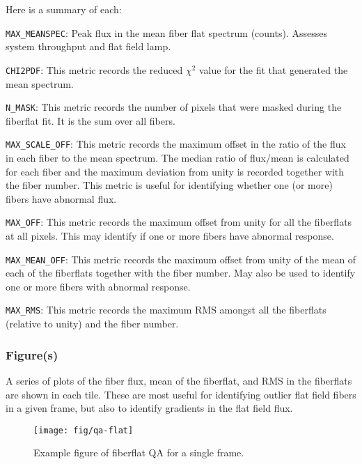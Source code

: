 \documentclass[12pt]{article}
\begin{document}
\noindent
Here is a summary of each:

\vskip 0.2in

\noindent
{\tt MAX\_MEANSPEC}:  Peak flux in the mean fiber flat spectrum 
(counts).  Assesses system throughput and flat field lamp.

\noindent
{\tt CHI2PDF}:  This metric records the reduced $\chi^2$ value 
for the fit that generated the mean spectrum.

\noindent
{\tt N\_MASK}:  This metric records the number of pixels that were
masked during the fiberflat fit.  It is the sum over all fibers.

\noindent
{\tt MAX\_SCALE\_OFF}:  This metric records the maximum offset 
in the ratio of the flux in each fiber to the mean spectrum.
The median ratio of flux/mean
is calculated for each fiber and the maximum
deviation from unity is recorded together with the fiber number.  
This metric is useful for
identifying whether one (or more) fibers have abnormal flux.

\noindent
{\tt MAX\_OFF}:  This metric records the maximum offset from
unity for all the fiberflats at all pixels.
This may identify if one or more fibers have abnormal response.

\noindent
{\tt MAX\_MEAN\_OFF}:  This metric records the maximum offset from
unity of the mean of each of the fiberflats together with the
fiber number.  May also be used
to identify one or more fibers with abnormal response.

\noindent
{\tt MAX\_RMS}:  This metric records the maximum RMS amongst
all the fiberflats (relative to unity) and the fiber number.

\subsubsection{Figure(s)}

A series of plots of the fiber flux, mean of the fiberflat, and
RMS in the fiberflats are shown in each tile.
These are most useful for identifying outlier flat field
fibers in a given frame, but also to identify gradients 
in the flat field flux.

\begin{figure}[htb]
\begin{center}
\texttt{[image: fig/qa-flat]}
\caption{Example figure of fiberflat QA
for a single frame.  
}
\label{fig:fiberflat_frame}
\end{center}
\end{figure}
\end{document}
